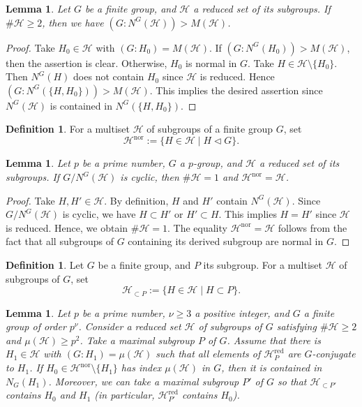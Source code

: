 \documentclass[12pt]{amsart}
\theoremstyle{plain}
\newtheorem{lem}[thm]{Lemma}
\theoremstyle{definition}
\newtheorem{dfn}[thm]{Definition}
\numberwithin{thm}{section}
\numberwithin{equation}{section}
\newcommand{\cH}{\mathcal{H}}
\DeclareMathOperator{\red}{red}
\DeclareMathOperator{\nor}{nor}
\begin{document}
\begin{lem}\label{lem:quot}
Let $G$ be a finite group, and $\cH$ a reduced set of its subgroups. If $\#\cH \geq 2$, then we have $(G:N^{G}(\cH))>M(\cH)$. 
\end{lem}

\begin{proof}
Take $H_{0}\in \cH$ with $(G:H_{0})=M(\cH)$. If $(G:N^{G}(H_{0}))>M(\cH)$, then the assertion is clear. Otherwise, $H_{0}$ is normal in $G$. Take $H\in \cH \setminus \{H_{0}\}$. Then $N^{G}(H)$ does not contain $H_{0}$ since $\cH$ is reduced. Hence $(G:N^{G}(\{H,H_{0}\}))>M(\cH)$. This implies the desired assertion since $N^{G}(\cH)$ is contained in $N^{G}(\{H,H_{0}\})$. 
\end{proof}

\begin{dfn}\label{dfn:hnor}
For a multiset $\cH$ of subgroups of a finite group $G$, set
\begin{equation*}
    \cH^{\nor}:=\{H\in \cH \mid H \triangleleft G\}. 
\end{equation*}
\end{dfn}

\begin{lem}\label{lem:sglh}
Let $p$ be a prime number, $G$ a $p$-group, and $\cH$ a reduced set of its subgroups. If $G/N^{G}(\cH)$ is cyclic, then $\#\cH=1$ and $\cH^{\nor}=\cH$. 
\end{lem}

\begin{proof}
Take $H,H'\in \cH$. By definition, $H$ and $H'$ contain $N^{G}(\cH)$. Since $G/N^{G}(\cH)$ is cyclic, we have $H\subset H'$ or $H'\subset H$. This implies $H=H'$ since $\cH$ is reduced. Hence, we obtain $\#\cH=1$. The equality $\cH^{\nor}=\cH$ follows from the fact that all subgroups of $G$ containing its derived subgroup are normal in $G$. 
\end{proof}

\begin{dfn}\label{dfn:hctp}
Let $G$ be a finite group, and $P$ its subgroup. For a multiset $\cH$ of subgroups of $G$, set
\begin{equation*}
\cH_{\subset P}:=\{H\in \cH\mid H\subset P\}. 
\end{equation*}
\end{dfn}

\begin{lem}\label{lem:nmlz}
Let $p$ be a prime number, $\nu \geq 3$ a positive integer, and $G$ a finite group of order $p^{\nu}$.
Consider a reduced set $\cH$ of subgroups of $G$ satisfying $\#\cH\geq 2$ and $\mu(\cH)\geq p^{2}$. Take a maximal subgroup $P$ of $G$. Assume that there is $H_{1}\in \cH$ with $(G:H_{1})=\mu(\cH)$ such that all elements of $\cH_{P}^{\red}$ are $G$-conjugate to $H_{1}$. 
If $H_{0}\in \cH^{\nor} \setminus \{H_{1}\}$ has index $\mu(\cH)$ in $G$, then it is contained in $N_{G}(H_{1})$. Moreover, we can take a maximal subgroup $P'$ of $G$ so that $\cH_{\subset P'}$ contains $H_{0}$ and $H_{1}$ (in particular, $\cH_{P'}^{\red}$ contains $H_{0}$). 
\end{lem}
\end{document}
